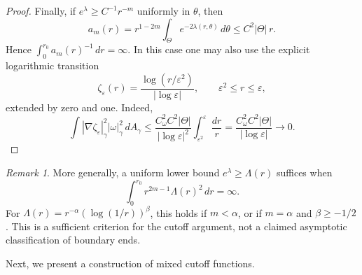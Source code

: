 \documentclass[11pt]{amsart}
\numberwithin{equation}{section}
\theoremstyle{definition}
\theoremstyle{remark}
\newtheorem{remark}[theorem]{Remark}
\begin{document}
\begin{proof}
Finally, if $e^\lambda\ge C^{-1}r^{-m}$ uniformly in $\theta$,
then
\[
a_m(r)
=r^{1-2m}\int_\Theta e^{-2\lambda(r,\theta)}\,d\theta
\le C^2|\Theta|\,r.
\]
Hence $\int_0^{r_0}a_m(r)^{-1}\,dr=\infty$.
In this case one may also use the explicit logarithmic transition
\[
\zeta_\varepsilon(r)=
\frac{\log(r/\varepsilon^2)}{|\log\varepsilon|},
\qquad
\varepsilon^2\le r\le\varepsilon,
\]
extended by zero and one. Indeed,
\[
\int |\nabla\zeta_\varepsilon|_\gamma^2
|\omega|_\gamma^2\,dA_\gamma
\le
\frac{C_\omega^2C^2|\Theta|}{|\log\varepsilon|^2}
\int_{\varepsilon^2}^{\varepsilon}\frac{dr}{r}
=
\frac{C_\omega^2C^2|\Theta|}{|\log\varepsilon|}
\longrightarrow0.
\]
\end{proof}

\begin{remark}\label{rem:power-log}
More generally, a uniform lower bound $e^\lambda\ge\Lambda(r)$ suffices when
\[
\int_0^{r_0}r^{2m-1}\Lambda(r)^2\,dr=\infty.
\]
For $\Lambda(r)=r^{-\alpha}(\log(1/r))^\beta$, this holds if $m<\alpha$, or if $m=\alpha$ and $\beta\ge-1/2$. This is a sufficient criterion for the cutoff argument, not a claimed asymptotic classification of boundary ends.
\end{remark}

Next, we present a construction of mixed cutoff functions.
\end{document}
